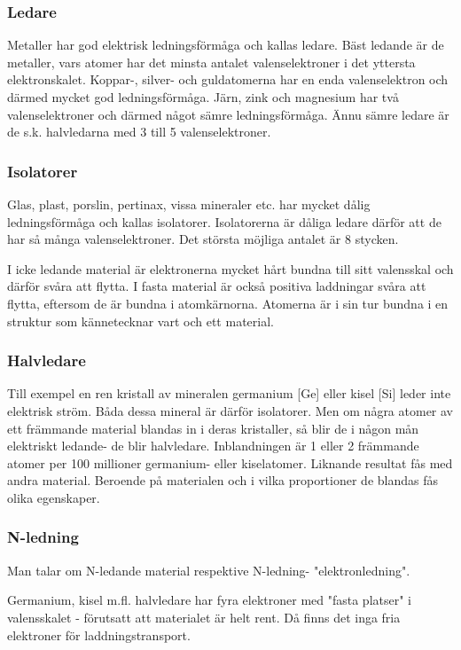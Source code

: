\subsubsection{Ledare}
Metaller har god elektrisk ledningsförmåga och kallas ledare. Bäst ledande är
de metaller, vars atomer har det minsta antalet valenselektroner i det yttersta
elektronskalet. Koppar-, silver- och guldatomerna har en enda valenselektron
och därmed mycket god ledningsförmåga. Järn, zink och magnesium har två
valenselektroner och därmed något sämre ledningsförmåga. Ännu sämre ledare
är de s.k. halvledarna med 3 till 5 valenselektroner.

\subsubsection{Isolatorer}
Glas, plast, porslin, pertinax, vissa mineraler etc. har mycket dålig
ledningsförmåga och kallas isolatorer. Isolatorerna är dåliga ledare därför att
de har så många valenselektroner. Det största möjliga antalet är 8 stycken.

I icke ledande material är elektronerna mycket hårt bundna till sitt valensskal
och därför svåra att flytta. I fasta material är också positiva laddningar
svåra att flytta, eftersom de är bundna i atomkärnorna. Atomerna är i sin tur
bundna i en struktur som kännetecknar vart och ett material.

\subsubsection{Halvledare}
Till exempel en ren kristall av mineralen germanium [Ge] eller kisel [Si] leder
inte elektrisk ström. Båda dessa mineral är därför isolatorer. Men om några
atomer av ett främmande material blandas in i deras kristaller, så blir de i
någon mån elektriskt ledande- de blir halvledare. Inblandningen är 1 eller 2
främmande atomer per 100 millioner germanium- eller kiselatomer. Liknande
resultat fås med andra material. Beroende på materialen och i vilka
proportioner de blandas fås olika egenskaper.

\subsubsection{N-ledning}
Man talar om N-ledande material respektive N-ledning- "elektronledning".

Germanium, kisel m.fl. halvledare har fyra elektroner med "fasta platser" i
valensskalet - förutsatt att materialet är helt rent. Då finns det inga fria
elektroner för laddningstransport.

